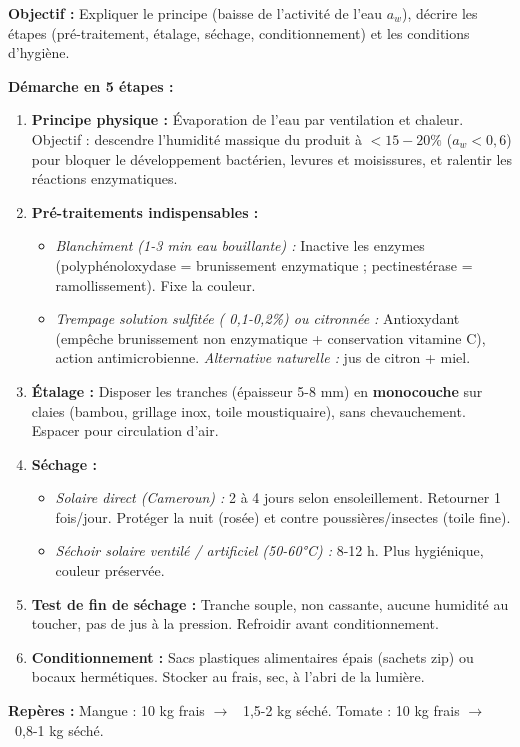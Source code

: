 \documentclass[11pt]{article}
\begin{document}
\begin{methode}
\textbf{Objectif :} Expliquer le principe (baisse de l'activité de l'eau $a_w$), décrire les étapes (pré-traitement, étalage, séchage, conditionnement) et les conditions d'hygiène.\par
\textbf{Démarche en 5 étapes :}
\begin{enumerate}
    \item \textbf{Principe physique :} Évaporation de l'eau par ventilation et chaleur. Objectif : descendre l'humidité massique du produit à \textbf{$< 15-20\%$} ($a_w < 0{,}6$) pour bloquer le développement bactérien, levures et moisissures, et ralentir les réactions enzymatiques.
    \item \textbf{Pré-traitements indispensables :}
    \begin{itemize}
        \item \textit{Blanchiment (1-3 min eau bouillante) :} Inactive les enzymes (polyphénoloxydase = brunissement enzymatique ; pectinestérase = ramollissement). Fixe la couleur.
        \item \textit{Trempage solution sulfitée ( 0,1-0,2\%) ou citronnée :} Antioxydant (empêche brunissement non enzymatique + conservation vitamine C), action antimicrobienne. \emph{Alternative naturelle :} jus de citron + miel.
    \end{itemize}
    \item \textbf{Étalage :} Disposer les tranches (épaisseur 5-8 mm) en \textbf{monocouche} sur claies (bambou, grillage inox, toile moustiquaire), sans chevauchement. Espacer pour circulation d'air.
    \item \textbf{Séchage :}
    \begin{itemize}
        \item \textit{Solaire direct (Cameroun) :} 2 à 4 jours selon ensoleillement. Retourner 1 fois/jour. Protéger la nuit (rosée) et contre poussières/insectes (toile fine).
        \item \textit{Séchoir solaire ventilé / artificiel (50-60°C) :} 8-12 h. Plus hygiénique, couleur préservée.
    \end{itemize}
    \item \textbf{Test de fin de séchage :} Tranche souple, non cassante, aucune humidité au toucher, pas de jus à la pression. Refroidir avant conditionnement.
    \item \textbf{Conditionnement :} Sacs plastiques alimentaires épais (sachets zip) ou bocaux hermétiques. Stocker au frais, sec, à l'abri de la lumière.
\end{enumerate}
\textbf{Repères :} Mangue : 10 kg frais $\rightarrow$ ~1,5-2 kg séché. Tomate : 10 kg frais $\rightarrow$ ~0,8-1 kg séché.
\end{methode}
\end{document}
